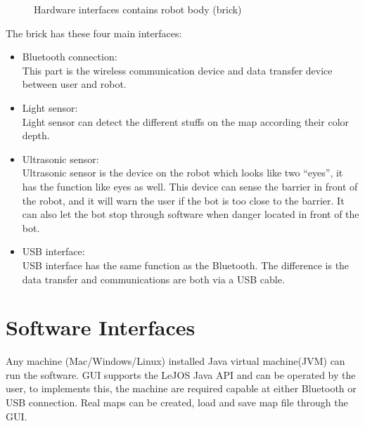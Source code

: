 \documentclass[11pt, a4paper]{report}
\begin{document}
\begin{figure}[ht]
\centering
\setlength\fboxsep{2pt}
\setlength\fboxrule{0.2pt}
\caption{Hardware interfaces contains robot body (brick)}
\label{sec:BRK}
\label{fig:BRK}
\end{figure}

The brick has these four main interfaces:
\begin{itemize}
	\item{Bluetooth connection:}\\
	This part is the wireless communication device and data transfer device between user and robot. 
	\item{Light sensor:}\\
	Light sensor can detect the different stuffs on the map according their color depth.
	\item{Ultrasonic sensor:}\\
	Ultrasonic sensor is the device on the robot which looks like two “eyes”, it has the function like eyes as well. This device can sense the barrier in front of the robot, and it will warn the user if the bot is too close to the barrier. It can also let the bot stop through software when danger located in front of the bot.
	\item{USB interface:}\\
	USB interface has the same function as the Bluetooth. The difference is the data transfer and communications are both via a USB cable.
\end{itemize}
\pagebreak
\section{Software Interfaces}
Any machine (Mac/Windows/Linux) installed Java virtual machine(JVM) can run the software. GUI supports the LeJOS Java API and can be operated by the user, to implements this, the machine are required capable at either Bluetooth or USB connection. Real maps can be created, load and save map file through the GUI.
\end{document}
